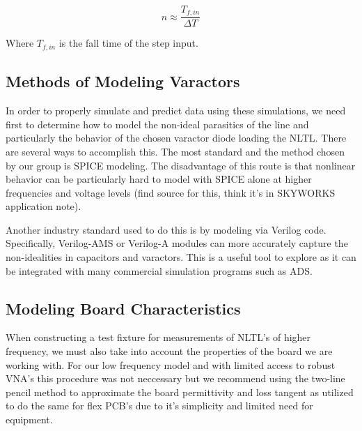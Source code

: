 \documentclass[journal]{IEEEtran} \usepackage[english]{babel}
\begin{document}
\begin{equation}\label{eq:ShockwaveSections}
	n \approx \frac{T_{f,in}}{\Delta{}T}
\end{equation}

Where $T_{f,in}$ is the fall time of the step input. 
 

\subsection{Methods of Modeling Varactors}

In order to properly simulate and predict data using these simulations, we
need first to determine how to model the non-ideal parasitics of the line
and particularly the behavior of the chosen varactor diode loading the NLTL.
There are several ways to accomplish this. The most standard and the method
chosen by our group is SPICE modeling. The disadvantage of this route is
that nonlinear behavior can be particularly hard to model with SPICE alone
at higher frequencies and voltage levels (find source for this, think it's
in SKYWORKS application note).

Another industry standard used to do this is by modeling via Verilog code.
Specifically, Verilog-AMS or Verilog-A modules can more accurately capture
the non-idealities in capacitors and varactors. This is a useful tool to
explore as it can be integrated with many commercial simulation programs
such as ADS.
    
    
    
   

\subsection{Modeling Board Characteristics}

When constructing a test fixture for measurements of NLTL's of higher frequency,
we must also take into account the properties of the board we are working with.
For our low frequency model and with limited access to robust VNA's this
procedure was not neccessary but we recommend using the two-line pencil
method to approximate the board permittivity and loss tangent as utilized to do
the same for flex PCB's due to it's simplicity and limited need for
equipment\cite{TwoLine}.
\end{document}
